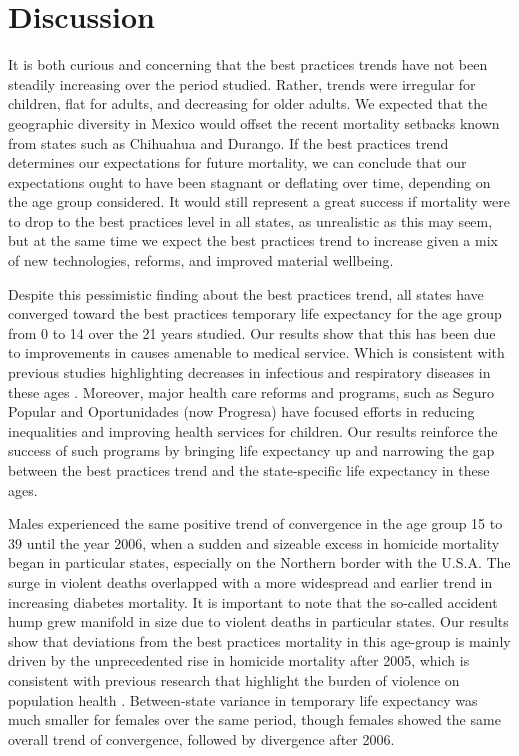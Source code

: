 \documentclass{article}
\begin{document}


\section*{Discussion}
It is both curious and concerning that the best practices trends have not been
steadily increasing over the period studied. Rather, trends were irregular for
children, flat for adults, and decreasing for older adults. We expected
that the geographic diversity in Mexico would offset the recent mortality
setbacks known from states such as Chihuahua and Durango. If the best practices
trend determines our expectations for future mortality, we can conclude that
our expectations ought to have been stagnant or deflating over time, depending
on the age group considered. It would still represent a great success if
mortality were to drop to the best practices level in all states, as unrealistic as this may seem, but at the same time we expect
the best practices trend to increase given a mix of new technologies, reforms,
and improved material wellbeing.

Despite this pessimistic finding about the best practices trend, all states have
converged toward the best practices temporary life expectancy for the age group
from 0 to 14 over the 21 years studied. Our results show that this has been due to improvements in causes amenable to medical service. Which is consistent with previous studies highlighting decreases in infectious and respiratory diseases in these ages \citep{canudas2014}. Moreover, major health care reforms and programs, such as Seguro Popular and Oportunidades (now Progresa) have focused efforts in reducing inequalities and improving health services for children. Our results reinforce the success of such programs by bringing life expectancy up and narrowing the gap between the best practices trend and the state-specific life expectancy in these ages.

Males experienced the same positive trend of convergence in the age group 15 to
39 until the year 2006, when a sudden and sizeable excess in homicide mortality
began in particular states, especially on the Northern border with the U.S.A.
The surge in violent deaths overlapped with a more widespread and earlier
trend in increasing diabetes mortality. It is important to note that the
so-called accident hump grew manifold in size due to violent deaths in
particular states. Our results show that deviations from the best practices mortality in this age-group is mainly driven by the unprecedented rise in homicide mortality after 2005, which is consistent with previous research that highlight the burden of violence on population health \citep{Aburto2015}.  Between-state variance in temporary life expectancy was much smaller for females over the same period, though females showed the same overall trend of convergence, followed by
divergence after 2006.
\end{document}

